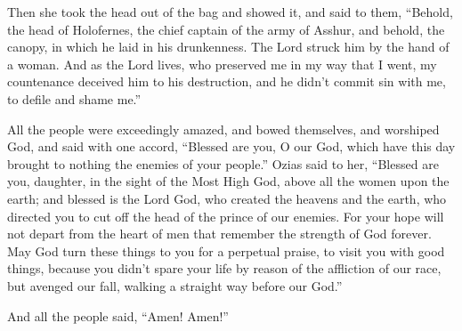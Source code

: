 {Then she took the head out of the bag and showed it, and said to them, “Behold, the head of Holofernes, the chief captain of the army of Asshur, and behold, the canopy, in which he laid in his drunkenness. The Lord struck him by the hand of a woman.
And as the Lord lives, who preserved me in my way that I went, my countenance deceived him to his destruction, and he didn’t commit sin with me, to defile and shame me.”
\par }{\PP {}All the people were exceedingly amazed, and bowed themselves, and worshiped God, and said with one accord, “Blessed are you, O our God, which have this day brought to nothing the enemies of your people.”
Ozias said to her, “Blessed are you, daughter, in the sight of the Most High God, above all the women upon the earth; and blessed is the Lord God, who created the heavens and the earth, who directed you to cut off the head of the prince of our enemies.
For your hope will not depart from the heart of men that remember the strength of God forever.
May God turn these things to you for a perpetual praise, to visit you with good things, because you didn’t spare your life by reason of the affliction of our race, but avenged our fall, walking a straight way before our God.”
\par }{\PP And all the people said, “Amen! Amen!”

}
